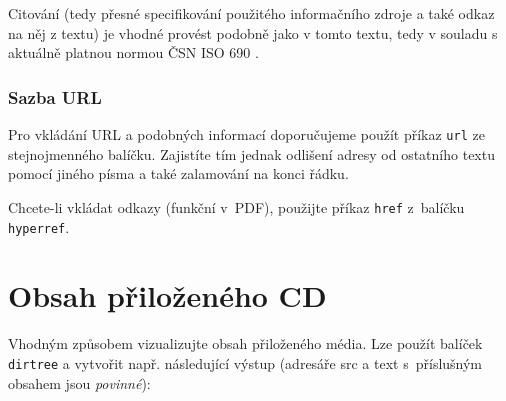 \documentclass[thesis=B,czech]{FITthesis}[2019/12/23]
\begin{document}
Citování (tedy přesné specifikování použitého informačního zdroje a také odkaz na něj z textu) je vhodné provést podobně jako v tomto textu, tedy v souladu s aktuálně platnou normou ČSN ISO 690 \cite{iso690}.

\subsection{Sazba URL}

Pro vkládání URL a podobných informací doporučujeme použít příkaz \verb|url| ze stejnojmenného balíčku. Zajistíte tím jednak odlišení adresy od ostatního textu pomocí jiného písma a také zalamování na konci řádku.

Chcete-li vkládat odkazy (funkční v~PDF), použijte příkaz \verb|href| z~balíčku \verb|hyperref|.


\chapter{Obsah přiloženého CD}

Vhodným způsobem vizualizujte obsah přiloženého média. Lze použít balíček \verb|dirtree| a vytvořit např. následující výstup (adresáře src a text s~příslušným obsahem jsou \emph{povinné}):

\begin{figure}
\end{figure}
\end{document}
